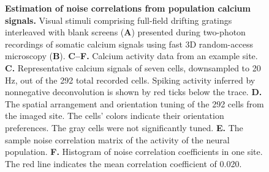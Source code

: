 \begin{figure}
\begin{leftfullpage}
\caption[Estimation of noise correlations from population calcium signals]
{{\bf Estimation of noise correlations from population calcium signals.}
Visual stimuli comprising full-field drifting gratings interleaved with blank screens ({\bf A}) presented during two-photon recordings of somatic calcium signals using fast 3D random-access microscopy ({\bf B}).
{\bf C--F.} Calcium activity data from an example site.
{\bf C.} Representative calcium signals of seven cells, downsampled to 20 Hz, out of the 292 total recorded cells. Spiking activity inferred by nonnegative deconvolution is shown by red ticks below the trace.
{\bf D.} The spatial arrangement and orientation tuning of the 292 cells from the imaged site. The cells' colors indicate their orientation preferences. The gray cells were not significantly tuned.
{\bf E.} The sample noise correlation matrix of the activity of the neural population.
{\bf F.} Histogram of noise correlation coefficients in one site. The red line indicates the mean correlation coefficient of 0.020.
}\label{fig:3}
\end{leftfullpage}
\end{figure}

